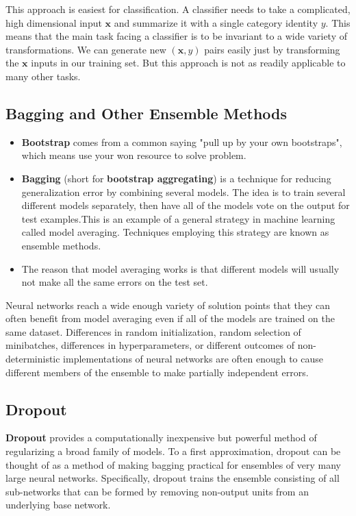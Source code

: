 \documentclass{article}
\begin{document}
	This approach is easiest for classification. A classifier needs to take a complicated, high dimensional input $\bm x$ and summarize it with a single category identity $y$. This means that the main task facing a classifier is to be invariant to a wide variety of transformations. We can generate new $(\bm x, y)$ pairs easily just by transforming
	the $\bm x$ inputs in our training set. But this approach is not as readily applicable to many other tasks.

	\subsection{Bagging and Other Ensemble Methods}
		\begin{itemize}
			\item \textbf{Bootstrap} comes from a common saying "pull up by your own bootstraps", which means use your won resource to solve problem.
			\item \textbf{Bagging} (short for \textbf{bootstrap aggregating}) is a technique for reducing generalization error by combining several models. The idea is to train several different models separately, then have all of the models vote on the	output for test examples.This is an example of a general strategy in machine learning called	model averaging. Techniques employing this strategy are known as ensemble methods.
			\item The reason that model averaging works is that different models will usually
			not make all the same errors on the test set.
		\end{itemize}
		Neural networks reach a wide enough variety of solution points that they can often benefit from model averaging even if all of the models are trained on the same dataset. Differences in random initialization, random selection of minibatches,
		differences in hyperparameters, or different outcomes of non-deterministic implementations of neural networks are often enough to cause different members of the ensemble to make partially independent errors.
	\subsection{Dropout}
			 \textbf{Dropout} provides a computationally inexpensive but	powerful method of regularizing a broad family of models. To a first approximation, dropout can be thought of as a method of making bagging practical for ensembles of very many large neural networks. Specifically, dropout trains the ensemble consisting of all sub-networks that can be formed by removing non-output units from an underlying base network.
		
\end{document}
